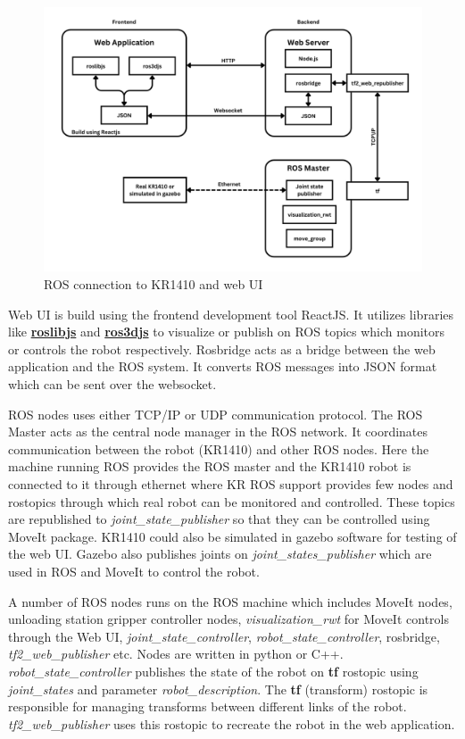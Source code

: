 \begin{figure}[h]
  \centering
  \includegraphics[width=1\textwidth]{figures/ros-web-graph.png}
  \caption{ROS connection to KR1410 and web UI}
  \label{fig:ros-web-graph}
\end{figure}

Web UI is build using the frontend development tool ReactJS. It utilizes libraries like \hyperref[par:roslibjs]{\textbf{roslibjs}} and \hyperref[par:ros3djs]{\textbf{ros3djs}} to visualize or publish on ROS topics which monitors or controls the robot respectively. Rosbridge acts as a bridge between the web application and the ROS system. It converts ROS messages into JSON format which can be sent over the websocket.

ROS nodes uses either TCP/IP or UDP communication protocol. 
The ROS Master acts as the central node manager in the ROS network. It coordinates communication between the robot (KR1410) and other ROS nodes.
Here the machine running ROS provides the ROS master \cite{rosmaster} and the KR1410 robot is connected to it through ethernet where KR ROS support provides few nodes and rostopics through which real robot can be monitored and controlled. These topics are republished to \textit{joint\_state\_publisher} so that they can be controlled using MoveIt package.
KR1410 could also be simulated in gazebo software for testing of the web UI. Gazebo also publishes joints on \textit{joint\_states\_publisher} which are used in ROS and MoveIt to control the robot.

A number of ROS nodes runs on the ROS machine which includes MoveIt nodes, unloading station gripper controller nodes, \textit{visualization\_rwt} for MoveIt controls through the Web UI, \textit{joint\_state\_controller}, \textit{robot\_state\_controller}, rosbridge, \textit{tf2\_web\_publisher} etc. Nodes are written in python or C++. \textit{robot\_state\_controller} publishes the state of the robot on \textbf{tf} rostopic using \textit{joint\_states} and parameter \textit{robot\_description}. The \textbf{tf} (transform) rostopic is responsible for managing transforms between different links of the robot. \textit{tf2\_web\_publisher} uses this rostopic to recreate the robot in the web application.

